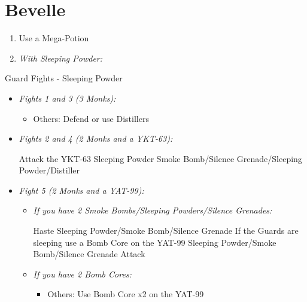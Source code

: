 \chapter{Bevelle}
\begin{enumerate}
	\item Use a Mega-Potion
	\item \textit{With Sleeping Powder:}
\end{enumerate}
\begin{battle}{Guard Fights - Sleeping Powder}
	\begin{itemize}
		\item \textit{Fights 1 and 3 (3 Monks):}
			\begin{itemize}
				\tidusf Attack
				\item Others: Defend or use Distillers
			\end{itemize}
		\item \textit{Fights 2 and 4 (2 Monks and a YKT-63):}
			\begin{itemize}
				\tidusf Attack the YKT-63
				\rikkuf Sleeping Powder
				\kimahrif Smoke Bomb/Silence Grenade/Sleeping Powder/Distiller
			\end{itemize}
		\item \textit{Fight 5 (2 Monks and a YAT-99):}
			\begin{itemize}
				\item \textit{If you have 2 Smoke Bombs/Sleeping Powders/Silence Grenades:}
					\begin{itemize}
						\tidusf Haste \rikku
						\rikkuf Sleeping Powder/Smoke Bomb/Silence Grenade
						\rikkuf If the Guards are sleeping use a Bomb Core on the YAT-99
						\rikkuf Sleeping Powder/Smoke Bomb/Silence Grenade
						\tidusf Attack
					\end{itemize}
				\item \textit{If you have 2 Bomb Cores:}
					\begin{itemize}
						\tidusf Attack the Monks
						\item Others: Use Bomb Core x2 on the YAT-99
					\end{itemize}
			\end{itemize}
	\end{itemize}
\end{battle}
